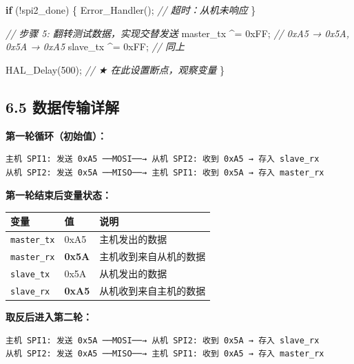 \documentclass[
  chinese,
  UTF8,
  oneside,
  openany]{ctexbook}
\newenvironment{Shaded}{}{}
\newcommand{\BaseNTok}[1]{\textcolor[rgb]{0.25,0.63,0.44}{#1}}
\newcommand{\CommentTok}[1]{\textcolor[rgb]{0.38,0.63,0.69}{\textit{#1}}}
\newcommand{\ControlFlowTok}[1]{\textcolor[rgb]{0.00,0.44,0.13}{\textbf{#1}}}
\newcommand{\DecValTok}[1]{\textcolor[rgb]{0.25,0.63,0.44}{#1}}
\newcommand{\NormalTok}[1]{#1}
\newcommand{\OperatorTok}[1]{\textcolor[rgb]{0.40,0.40,0.40}{#1}}
\begin{document}
\begin{Shaded}
\begin{Highlighting}[]
    \ControlFlowTok{if} \OperatorTok{(!}\NormalTok{spi2\_done}\OperatorTok{)} \OperatorTok{\{}
\NormalTok{        Error\_Handler}\OperatorTok{();}  \CommentTok{// 超时：从机未响应}
    \OperatorTok{\}}

    \CommentTok{// 步骤 5: 翻转测试数据，实现交替发送}
\NormalTok{    master\_tx }\OperatorTok{\^{}=} \BaseNTok{0xFF}\OperatorTok{;}   \CommentTok{// 0xA5 → 0x5A, 0x5A → 0xA5}
\NormalTok{    slave\_tx  }\OperatorTok{\^{}=} \BaseNTok{0xFF}\OperatorTok{;}   \CommentTok{// 同上}

\NormalTok{    HAL\_Delay}\OperatorTok{(}\DecValTok{500}\OperatorTok{);}  \CommentTok{// ★ 在此设置断点，观察变量}
\OperatorTok{\}}
\end{Highlighting}
\end{Shaded}

\subsection{6.5
数据传输详解}\label{ux6570ux636eux4f20ux8f93ux8be6ux89e3}

\textbf{第一轮循环（初始值）：}

\begin{verbatim}
主机 SPI1: 发送 0xA5 ──MOSI──→ 从机 SPI2: 收到 0xA5 → 存入 slave_rx
从机 SPI2: 发送 0x5A ──MISO──→ 主机 SPI1: 收到 0x5A → 存入 master_rx
\end{verbatim}

\textbf{第一轮结束后变量状态：}

\begin{longtable}[]{@{}lll@{}}
\toprule\noalign{}
变量 & 值 & 说明 \\
\midrule\noalign{}
\endhead
\bottomrule\noalign{}
\endlastfoot
\texttt{master\_tx} & 0xA5 & 主机发出的数据 \\
\texttt{master\_rx} & \textbf{0x5A} & 主机收到来自从机的数据 \\
\texttt{slave\_tx} & 0x5A & 从机发出的数据 \\
\texttt{slave\_rx} & \textbf{0xA5} & 从机收到来自主机的数据 \\
\end{longtable}

\textbf{取反后进入第二轮：}

\begin{verbatim}
主机 SPI1: 发送 0x5A ──MOSI──→ 从机 SPI2: 收到 0x5A → 存入 slave_rx
从机 SPI2: 发送 0xA5 ──MISO──→ 主机 SPI1: 收到 0xA5 → 存入 master_rx
\end{verbatim}
\end{document}
